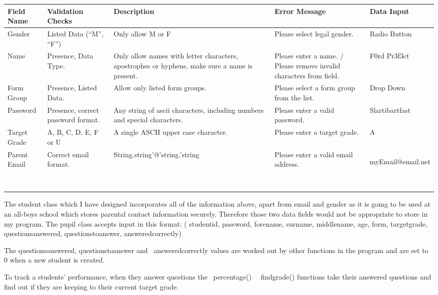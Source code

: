 \documentclass[a4paper,12pt]{report}
\begin{document}
\begin{flushleft}
\tablefirsthead{}
\tablehead{}
\tabletail{}
\tablelasttail{}
\begin{supertabular}{|m{0.7156598in}|m{0.69835985in}|m{2.19556in}|m{0.8288598in}|m{1.5691599in}|}
\hline
Field Name &
Validation Checks &
Description &
Error Message &
Data Input\\\hline
Gender &
Listed Data (``M'', ``F'') &
Only allow M or F &
Please select legal gender. &
Radio Button\\\hline
Name &
Presence, Data Type. &
Only allow names with letter characters, apostrophes or hyphens, make sure a name is present. &
Please enter a name. / Please remove invalid characters from field. &
F0rd Pr3f3ct\\\hline
Form Group &
Presence, Listed Data. &
Allow only listed form groups. &
Please select a form group from the list. &
Drop Down\\\hline
Password &
Presence, correct password format. &
Any string of ascii characters, including numbers and special characters. &
Please enter a valid password. &
Slartibartfast\\\hline
Target Grade &
A, B, C, D, E, F or U &
A single ASCII upper case character. &
Please enter a target grade. &
A\\\hline
Parent Email &
Correct email format. &
{}String.string'@'string.'string &
Please enter a valid email address. &
myEmail@email.net

~
\\\hline
\end{supertabular}
\end{flushleft}


The student class which I have designed incorporates all of the information above, apart from email and gender as it is going to be used at an all-boys school which stores parental contact information securely. Therefore those two data fields would not be appropriate to store in my program. The pupil class accepts input in this format: ( studentid, password, forename, surname, middlename, age, form, targetgrade, questionsanswered, questionstoanswer, answeredcorrectly)


\bigskip

The questionsanswered, questionstoanswer and \ answeredcorrectly values are worked out by other functions in the program and are set to 0 when a new student is created.

To track a students' performance, when they answer questions the \ percentage() \ \ findgrade() functions take their answered questions and find out if they are keeping to their current target grade.
\end{document}
